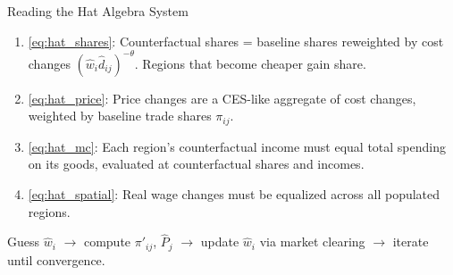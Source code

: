 \documentclass{beamer}
\begin{document}
\begin{frame}{Reading the Hat Algebra System}

    {\small
    \begin{enumerate}
        \item {} \eqref{eq:hat_shares}: Counterfactual shares = baseline shares reweighted by cost changes $(\hat{w}_i \hat{d}_{ij})^{-\theta}$. Regions that become cheaper gain share.
        \item {} \eqref{eq:hat_price}: Price changes are a CES-like aggregate of cost changes, weighted by baseline trade shares $\pi_{ij}$.
        \item {} \eqref{eq:hat_mc}: Each region's counterfactual income must equal total spending on its goods, evaluated at counterfactual shares and incomes.
        \item {} \eqref{eq:hat_spatial}: Real wage changes must be equalized across all populated regions.
    \end{enumerate}
    }

    \vspace{0.3em}
     Guess $\hat{w}_i$ $\rightarrow$ compute $\pi'_{ij}$, $\hat{P}_j$ $\rightarrow$ update $\hat{w}_i$ via market clearing $\rightarrow$ iterate until convergence.

\end{frame}
\end{document}
